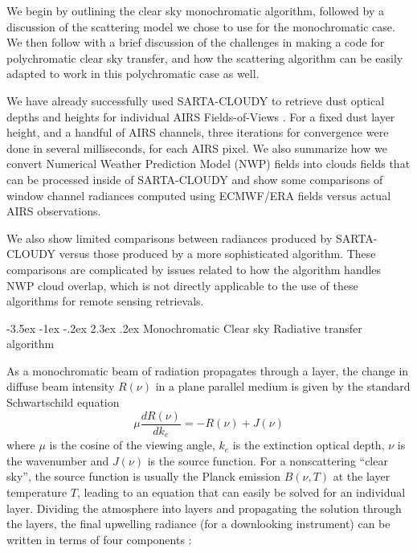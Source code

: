 \documentclass[11pt]{article}
\makeatletter
\newcommand{\sasc}{\textsf{SARTA-CLOUDY}\xspace}
\renewcommand{\section}{\@startsection {section}{1}{\z@}%
                                   {-3.5ex \@plus -1ex \@minus -.2ex}%
                                   {2.3ex \@plus.2ex}%
                                   {\reset@font\large\bfseries}}
\makeatother
\begin{document}
    We begin by outlining the clear sky monochromatic algorithm,
    followed by a discussion of the scattering model we chose to use
    for the monochromatic case. We then follow with a brief discussion
    of the challenges in making a code for polychromatic clear sky
    transfer, and how the scattering algorithm can be easily adapted
    to work in this polychromatic case as well.

    We have already successfully used \sasc to retrieve dust optical
    depths and heights for individual AIRS Fields-of-Views
    \cite{mac:10}.  For a fixed dust layer height, and a handful of
    AIRS channels, three iterations for convergence were done in
    several milliseconds, for each AIRS pixel. We also summarize how
    we convert Numerical Weather Prediction Model (NWP) fields into
    clouds fields that can be processed inside of \sasc and show some
    comparisons of window channel radiances computed using ECMWF/ERA
    fields versus actual AIRS observations.

    We also show limited comparisons between radiances produced by
    \sasc versus those produced by a more sophisticated algorithm.
    These comparisons are complicated by issues related to how the
    algorithm handles NWP cloud overlap, which is not directly
    applicable to the use of these algorithms for remote sensing
    retrievals.

    \section{Monochromatic Clear sky Radiative transfer algorithm}

    As a monochromatic beam of radiation propagates through a layer,
    the change in diffuse beam intensity $R(\nu)$ in a plane parallel
    medium is given by the standard Schwartschild equation
    \cite{lio:80,goo:89,edw:92}
    \begin{equation}
      \mu \frac{dR(\nu)}{dk_{e}} = -R(\nu) + J(\nu)
      \label{eqn:sch}
    \end{equation}
    where $\mu$ is the cosine of the viewing angle, $k_{e}$ is the
    extinction optical depth, $\nu$ is the wavenumber and $J(\nu)$ is
    the source function. For a nonscattering ``clear sky'', the source
    function is usually the Planck emission $B(\nu,T)$ at the layer
    temperature $T$, leading to an equation that can easily be solved
    for an individual layer. Dividing the atmosphere into layers and
    propagating the solution through the layers, the final upwelling
    radiance (for a downlooking instrument) can be written in terms of
    four components :
\end{document}
